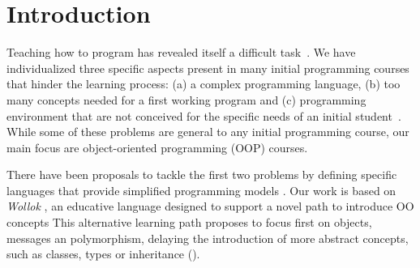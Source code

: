 \section{Introduction}
\label{sec:intro}



Teaching how to program has revealed itself a difficult task~\cite{dijkstra_89a, jenkins2002difficulty}.
We have individualized three specific aspects present in many initial programming courses that hinder the learning process: 
(a) a complex programming language,
(b) too many concepts needed for a first working program and
(c) programming environment that are not conceived for the specific needs of an initial student~\cite{singh2012}.
While some of these problems are general to any initial programming course, 
our main focus are object-oriented programming (OOP) courses.


\smallskip

There have been proposals to tackle the first two problems by defining specific languages
that provide simplified programming models \cite{bergin_karel++:_1996,harrisonmama}.
Our work is based on \emph{Wollok} \cite{passerini2017wollok}, 
an educative language designed to support a novel path to introduce OO concepts \cite{lombardi_instances_2007,lombardi_carlos_alumnos_2008,spigariol_lucas_ensenando_2013}
This alternative learning path proposes to focus first on objects, messages an polymorphism, 
delaying the introduction of more abstract concepts, such as classes, types or inheritance
(\cf {}).

